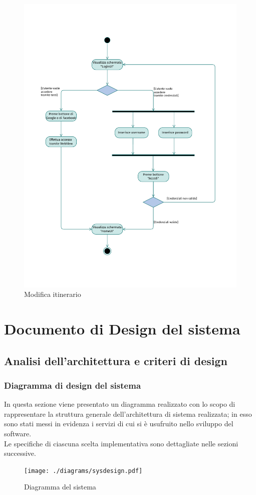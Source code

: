 \documentclass{natourDoc}
\begin{document}
\newpage
\begin{figure}[!htbp]
	\centering
	\includegraphics[width=\textwidth, page=19]{./diagrams/activity.pdf}
	\caption{Modifica itinerario}
\end{figure}
\FloatBarrier

\newpage
\section{Documento di Design del sistema}
\subsection{Analisi dell'architettura e criteri di design}
\subsubsection{Diagramma di design del sistema}
In questa sezione viene presentato un diagramma realizzato con lo scopo di
rappresentare la struttura generale dell'architettura di sistema realizzata;
in esso sono stati messi in evidenza i servizi di cui si è usufruito nello sviluppo del software. \\
Le specifiche di ciascuna scelta implementativa sono
dettagliate nelle sezioni successive.
\begin{figure}[!htbp]
	\centering
	\texttt{[image: ./diagrams/sysdesign.pdf]}
	\caption{Diagramma del sistema}
\end{figure}
\end{document}
